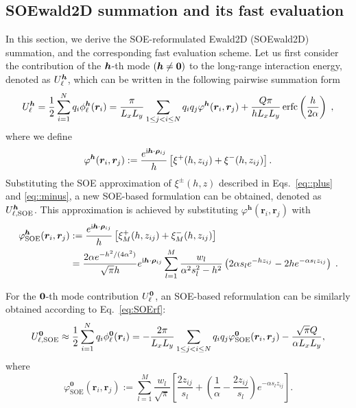 \subsection{SOEwald2D summation and its fast evaluation}\label{subsec::reforEwald2}
In this section, we derive the SOE-reformulated Ewald2D (SOEwald2D) summation, and the corresponding fast evaluation scheme. 
Let us first consider the contribution of the $\boldsymbol{h}$-th mode $(\boldsymbol{h} \neq \boldsymbol{0})$ to the long-range interaction energy, denoted as $U_{\ell}^{\boldsymbol{h}}$, which can be written in the following pairwise summation form 
\begin{equation}\label{eq::pairssum8}
	\begin{split}
		U_{\ell}^{\boldsymbol{h}} = \frac{1}{2} \sum_{i = 1}^N q_{i} \phi^{\boldsymbol{h}}_\ell(\boldsymbol{r}_{i}) =\frac{\pi}{L_xL_y}\sum_{1\leq j<i\leq N}q_{i}q_{j} \varphi^{\bm{h}} (\bm{r}_{i},\bm{r}_{j}) + \frac{Q \pi}{h L_x L_y} \operatorname{erfc}\left(\frac{h}{2 \alpha}\right)\;,
	\end{split}
\end{equation}
where we define
\begin{equation}\label{eq:varphi_k}
	\varphi^{\bm{h}}(\bm{r}_{i},\bm{r}_{j}):=\frac{e^{\mathrm{i} \boldsymbol{h} \cdot \boldsymbol{\rho}_{ij}}}{h} \left[\xi^{+}(h, z_{ij})+\xi^{-}(h, z_{ij})\right].
\end{equation}
Substituting the SOE approximation of $\xi^{\pm}(h,z)$ described in Eqs.~\eqref{eq::plus} and \eqref{eq::minus}, a new SOE-based formulation can be obtained, denoted as $U_{\ell,\text{SOE}}^{\boldsymbol{h}}$. 
This approximation is achieved by substituting $\varphi^{\bm{h}}(\bm{r}_{i},\bm{r}_{j})$ with
\begin{equation}\label{eq::SOEphi}
	\begin{split}
		\varphi^{\bm{h}}_{\text{SOE}}(\bm{r}_{i},\bm{r}_{j}) & := \frac{e^{\mathrm{i} \boldsymbol{h} \cdot \boldsymbol{\rho}_{ij}}}{h} \left[\xi^{+}_M(h, z_{ij})+\xi^{-}_M(h, z_{ij})\right]\\
		&=\frac{2\alpha e^{-h^2/(4\alpha^2)}}{\sqrt{\pi}h}e^{\mathrm{i}\boldsymbol{h} \cdot \boldsymbol{\rho}_{ij}} \sum_{l = 1}^{M}  \frac{w_l}{\alpha^2 s_l^2 - h^2}\left( 2 \alpha s_l e^{-h z_{ij}} - 2he^{-\alpha s_l z_{ij}}\right) \;.
	\end{split}
\end{equation}

For the $\boldsymbol{0}$-th mode contribution $U_{\ell}^{\boldsymbol{0}}$, an SOE-based reformulation can be similarly obtained according to Eq.~\eqref{eq:SOErf}:
\begin{equation}\label{eq::Ul0SOE}
	U_{\ell,\text{SOE}}^{\bm{0}} \approx \frac{1}{2} \sum_{i = 1}^N q_{i} \phi^{\bm{0}}_\ell(\boldsymbol{r}_{i}) = - \frac{2\pi}{L_xL_y}\sum_{1\leq j < i \leq N}q_{i}q_{j}\varphi^{\bm{0}}_{\text{SOE}}(\bm{r}_{i},\bm{r}_{j})-\frac{\sqrt{\pi} Q}{\alpha L_xL_y},
\end{equation}
where
\begin{equation}\label{eq::32}
	\varphi^{\bm{0}}_{\text{SOE}}(\bm{r}_{i},\bm{r}_{j}):=\sum_{l=1}^{M}\frac{w_l}{\sqrt{\pi}}\left[\frac{2z_{ij}}{s_l}+\left(\frac{1}{\alpha}-\frac{2z_{ij}}{s_l}\right)e^{-\alpha s_l z_{ij}}\right].
\end{equation}

